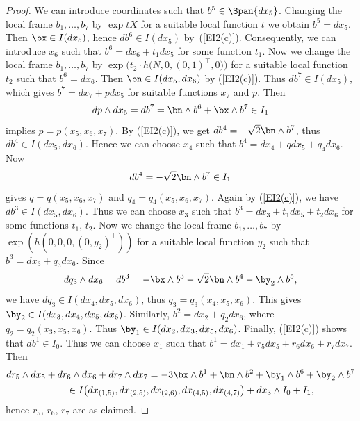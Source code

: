 \begin{proof} We can introduce coordinates such that $b^5\in\Span\{dx_5\}$. Changing the local frame $b_1,\dots , b_7$ by $\exp tX$ for a suitable local function $t$ we obtain $b^5=dx_5$. Then $\bx\in I(dx_5)$, hence $db^6\in I(dx_5)$ by~(\ref{EI2(c)}). Consequently, we can introduce $x_6$ such that $b^6 =dx_6 + t_1 dx_5$ for some function $t_1$. Now we change the local frame $b_1,\dots,b_7$ by $\exp \big(t_2\cdot h\big(N,0,(0,1)^\top,0\big)\big)$ for a suitable local function $t_2$ such that $b^6=dx_6$. Then $\bn\in I(dx_5,dx_6)$ by (\ref{EI2(c)}).
Thus $db^7\in I(dx_5)$, which gives $b^7=dx_7+pdx_5$ for suitable functions $x_7$ and $p$. Then
\begin{gather*}dp\wedge dx_5=db^7=\bn\wedge b^6+ \bx\wedge b^7 \in I_1\end{gather*}
implies $p=p(x_5,x_6,x_7)$. By (\ref{EI2(c)}), we get $db^4=-\sqrt 2 \bn\wedge b^7$, thus $db^4\in I(dx_5, dx_6)$. Hence we can choose $x_4$ such that $b^4=dx_4+ qdx_5+q_4dx_6$. Now
\begin{gather*}db^4=-\sqrt 2 \bn\wedge b^7\in I_1\end{gather*} gives $q=q(x_5,x_6,x_7)$ and $q_4=q_4(x_5,x_6,x_7)$. Again by (\ref{EI2(c)}), we have $db^3\in I(dx_5,dx_6)$. Thus we can choose $x_3$ such that $b^3=dx_3+t_1dx_5+t_2 dx_6$ for some functions $t_1$, $t_2$. Now we change the local frame $b_1,\dots,b_7$ by $\exp (h(0,0,0,(0,y_2)^\top))$ for a suitable local function $y_2$ such that $b^3=dx_3+q_3dx_6$. Since
\begin{gather*}dq_3\wedge dx_6=db^3=-\bx\wedge b^3 -\sqrt 2\bn\wedge b^4-\by_2\wedge b^5,\end{gather*}
we have $dq_3\in I(dx_4,dx_5, dx_6)$, thus $q_3=q_3(x_4,x_5,x_6)$. This gives $\by_2\in I(dx_3,dx_4,dx_5,dx_6)$.
Similarly, $b^2=dx_2+q_2dx_6$, where $q_2=q_2(x_3,x_5,x_6)$. Thus $\by_1\in I(dx_2,dx_3,dx_5,dx_6)$. Finally, (\ref{EI2(c)}) shows that $db^1\in I_0$. Thus we can choose $x_1$ such that $b^1=dx_1+ r_5dx_5+r_6dx_6+r_7dx_7$. Then
\begin{gather*}
 dr_5\wedge dx_5+dr_6\wedge dx_6+dr_7\wedge dx_7= -3\bx\wedge b^1+\bn\wedge b^2+\by_1\wedge b^6+\by_2\wedge b^7 \\
\qquad{} \in I\big( dx_{(1,5)}, dx_{(2,5)}, dx_{(2,6)}, dx_{(4,5)}, dx_{(4,7)}\big)+ dx_3\wedge I_0 +I_1,
\end{gather*}
hence $r_5$, $r_6$, $r_7$ are as claimed.


\end{proof}
